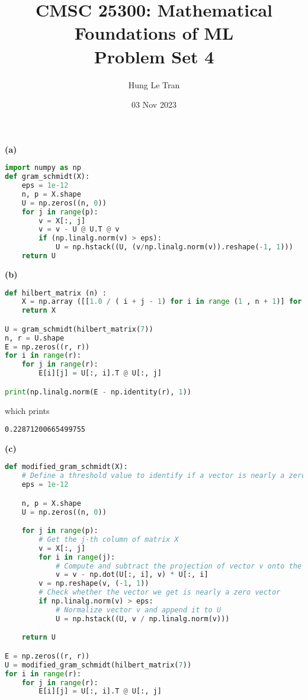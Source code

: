 \documentclass[a4paper, 12pt]{article}
\title{CMSC 25300: Mathematical Foundations of ML \\ \large Problem Set 4}
\date{03 Nov 2023}
\author{Hung Le Tran}
\begin{document}
\maketitle
\setcounter{section}{4}
\begin{problem} [Problem 1]
\end{problem}
\begin{solution}
    \textbf{(a)}
    \begin{lstlisting}[language=python]
import numpy as np
def gram_schmidt(X):
    eps = 1e-12
    n, p = X.shape
    U = np.zeros((n, 0))
    for j in range(p):
        v = X[:, j]
        v = v - U @ U.T @ v
        if (np.linalg.norm(v) > eps):
            U = np.hstack((U, (v/np.linalg.norm(v)).reshape(-1, 1)))
    return U
\end{lstlisting}

    \textbf{(b)}
    \begin{lstlisting}[language=python]
def hilbert_matrix (n) :
    X = np.array ([[1.0 / ( i + j - 1) for i in range (1 , n + 1)] for j in range (1 , n + 1)])
    return X

U = gram_schmidt(hilbert_matrix(7))
n, r = U.shape
E = np.zeros((r, r))
for i in range(r):
    for j in range(r):
        E[i][j] = U[:, i].T @ U[:, j]

print(np.linalg.norm(E - np.identity(r), 1))
\end{lstlisting}
    which prints
    \begin{lstlisting}
0.22871200665499755
\end{lstlisting}

    \textbf{(c)}
    \begin{lstlisting}[language=python]
def modified_gram_schmidt(X):
    # Define a threshold value to identify if a vector is nearly a zero vector.
    eps = 1e-12

    n, p = X.shape
    U = np.zeros((n, 0))

    for j in range(p):
        # Get the j-th column of matrix X
        v = X[:, j]
        for i in range(j):
            # Compute and subtract the projection of vector v onto the i-th column of U
            v = v - np.dot(U[:, i], v) * U[:, i]
        v = np.reshape(v, (-1, 1))
        # Check whether the vector we get is nearly a zero vector
        if np.linalg.norm(v) > eps:
            # Normalize vector v and append it to U
            U = np.hstack((U, v / np.linalg.norm(v)))

    return U

E = np.zeros((r, r))
U = modified_gram_schmidt(hilbert_matrix(7))
for i in range(r):
    for j in range(r):
        E[i][j] = U[:, i].T @ U[:, j]


\end{lstlisting}
\end{solution}
\end{document}
